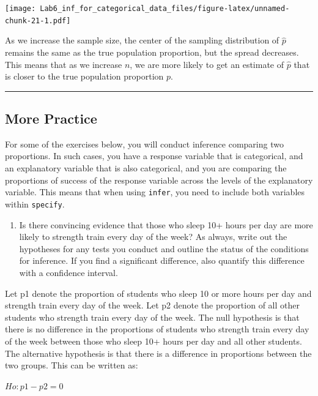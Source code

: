 \documentclass[
]{article}
\providecommand{\tightlist}{%
  \setlength{\itemsep}{0pt}\setlength{\parskip}{0pt}}
\begin{document}
\texttt{[image: Lab6\_inf\_for\_categorical\_data\_files/figure-latex/unnamed-chunk-21-1.pdf]}

As we increase the sample size, the center of the sampling distribution
of \(\hat{p}\) remains the same as the true population proportion, but
the spread decreases. This means that as we increase \(n\), we are more
likely to get an estimate of \(\hat{p}\) that is closer to the true
population proportion \(p\).

\begin{center}\rule{0.5\linewidth}{0.5pt}\end{center}

\hypertarget{more-practice}{%
\subsection{More Practice}\label{more-practice}}

For some of the exercises below, you will conduct inference comparing
two proportions. In such cases, you have a response variable that is
categorical, and an explanatory variable that is also categorical, and
you are comparing the proportions of success of the response variable
across the levels of the explanatory variable. This means that when
using \texttt{infer}, you need to include both variables within
\texttt{specify}.

\begin{enumerate}
\def\labelenumi{\arabic{enumi}.}
\setcounter{enumi}{8}
\tightlist
\item
  Is there convincing evidence that those who sleep 10+ hours per day
  are more likely to strength train every day of the week? As always,
  write out the hypotheses for any tests you conduct and outline the
  status of the conditions for inference. If you find a significant
  difference, also quantify this difference with a confidence interval.
\end{enumerate}

Let p1 denote the proportion of students who sleep 10 or more hours per
day and strength train every day of the week. Let p2 denote the
proportion of all other students who strength train every day of the
week. The null hypothesis is that there is no difference in the
proportions of students who strength train every day of the week between
those who sleep 10+ hours per day and all other students. The
alternative hypothesis is that there is a difference in proportions
between the two groups. This can be written as:

\(Ho: p1 - p2 = 0\)
\end{document}
